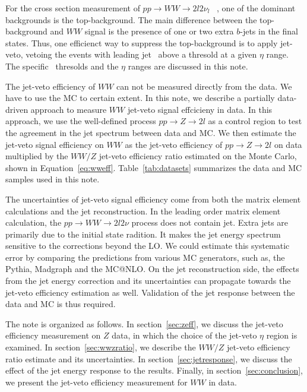 For the cross section measurement of $pp\to WW\to 2l 2\nu_l$
~\cite{wwanalysis}, one of the dominant backgrounds is the top-background. 
The main difference between the top-background and $WW$ signal is the 
presence of one or two extra $b$-jets in the final states. Thus, one 
efficienct way to suppress the top-background is to apply 
jet-veto, vetoing the events with leading jet \pt\, above a thresold at a 
given $\eta$ range. The specific \pt\, thresolds and the $\eta$ 
ranges are discussed in this note. 

The jet-veto efficiency of $WW$ can not be measured directly 
from the data. We have to use the MC to certain extent. 
In this note, we describe a partially data-driven approach to 
measure $WW$ jet-veto signal effcicieny in data. 
In this approach, we use the well-defined process 
$pp\to Z\to 2l$ as a control region to test the agreement 
in the jet spectrum between data and MC. 
We then estimate the jet-veto signal efficiency on $WW$ as the 
jet-veto efficiency of $pp\to Z\to 2l$ on data multiplied 
by the $WW/Z$ jet-veto efficiency ratio estimated on the Monte Carlo, 
shown in Equation~\ref{eq:wweff}. 
Table~\ref{tab:datasets} summarizes the data and MC samples used in this note. 

The uncertainties of jet-veto signal efficiency come from 
both the matrix element calculations %
and the jet reconstruction. %
In the leading order matrix element calculation, 
the $pp\to WW\to 2l2\nu$ process does not contain jet.
Extra jets are primarily due to the initial 
state radition. It makes the jet energy spectrum 
sensitive to the corrections beyond the LO. 
We could estimate this systematic error by 
comparing the predictions from various MC generators, 
such as, the Pythia, Madgraph and the MC@NLO. 
On the jet reconstruction side, the effects from the jet energy correction 
and its uncertainties can propagate towards the jet-veto efficiency 
estimation as well. Validation of the jet response between the 
data and MC is thus required.

The note is organized as follows. In section~\ref{sec:zeff}, we discuss the jet-veto 
efficiency measurement on $Z$ data, in which 
the choice of the jet-veto $\eta$ region is examined. 
In section~\ref{sec:wwzratio}, we describe the $WW/Z$ jet-veto 
efficiency ratio estimate and its uncertainties. 
In section~\ref{sec:jetresponse}, we discuss the effect of the 
jet energy response to the results. Finally, in section~\ref{sec:conclusion}, 
we present the jet-veto efficiency measurement for $WW$ in data. 


